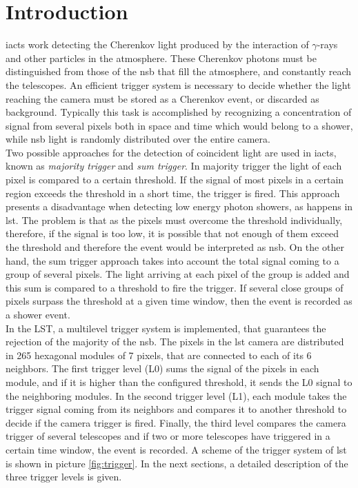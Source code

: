 \documentclass[main.tex]{subfiles}
\begin{document}
\glsresetall

\section{Introduction}

\glspl{iact} work detecting the Cherenkov light produced by the interaction of $\gamma$-rays and other particles in the
atmosphere. These Cherenkov photons must be distinguished from those of the \gls{nsb} that fill the atmosphere, and constantly reach the telescopes. An efficient trigger system is necessary to decide whether the light reaching the camera must be stored as a Cherenkov event, or discarded as background.
Typically this task is accomplished by recognizing a concentration of signal from several pixels both in space and time which would belong to a shower, while \gls{nsb} light is randomly distributed over the entire camera.\\
Two possible approaches for the detection of coincident light are used in \glspl{iact}, known as \textit{majority trigger} and \textit{sum trigger}. In majority trigger the light of each pixel is compared to a certain
threshold. If the signal of most pixels in a certain region exceeds the threshold in a short time, the trigger is fired. This approach presents a disadvantage when detecting low energy photon showers, as happens in \gls{lst}. The problem is that as the pixels must overcome the threshold individually, therefore, if the signal is too low, it is possible that not enough of them exceed the threshold and therefore the event would be interpreted as \gls{nsb}. On the other hand, the sum trigger approach takes into account the total signal coming to a group of several pixels. The light arriving at each pixel of the group is added and this sum is compared to a threshold to fire the trigger. If several close groups of pixels surpass the threshold at a given time window, then the event is recorded as a shower event.\\
In the LST, a multilevel trigger system is implemented, that guarantees the rejection of the majority of the \gls{nsb}.
The pixels in the \gls{lst} camera are distributed in 265 hexagonal modules of 7 pixels, that are connected to each of its 6 neighbors.
The first trigger level (L0) sums the signal of the pixels in each module, and if it is higher than the configured threshold, it sends the L0 signal to the neighboring modules. In the second trigger level (L1), each module takes the trigger signal coming from its neighbors and
compares it to another threshold to decide if the camera trigger is fired. Finally, the third level compares the camera trigger of
several telescopes and if two or more telescopes have triggered in a certain time window, the event is recorded. A scheme of the trigger system of \gls{lst} is shown in picture \ref{fig:trigger}. In the next sections, a detailed description of the three trigger levels is given.
\end{document}
